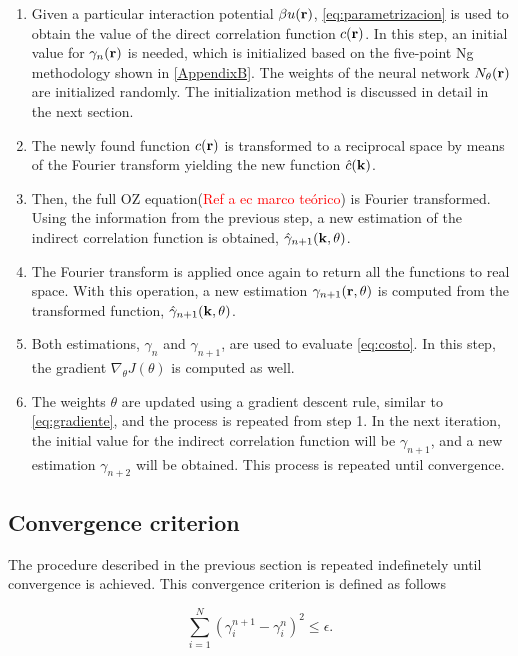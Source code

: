 \begin{enumerate}
    \item Given a particular interaction potential $\beta u(\mathbf{r})$, \autoref{eq:parametrizacion} is used to obtain the value of the direct correlation function $c(\mathbf{r})$. In this step, an initial value for $\gamma_{n}(\mathbf{r})$ is needed, which is initialized based on the five-point Ng methodology shown in \autoref{AppendixB}. The weights of the neural network $N_{\theta}(\mathbf{r})$ are initialized randomly. The initialization method is discussed in detail in the next section.
    \item The newly found function $c(\mathbf{r})$ is transformed to a reciprocal space by means of the Fourier transform yielding the new function $\hat{c}(\mathbf{k})$.
    \item Then, the full OZ equation(\textcolor{red}{Ref a ec marco teórico}) is Fourier transformed. Using the information from the previous step, a new estimation of the indirect correlation function is obtained, $\hat{\gamma}_{n+1}(\mathbf{k}, \theta)$.
    \item The Fourier transform is applied once again to return all the functions to real space. With this operation, a new estimation $\gamma_{n+1}(\mathbf{r}, \theta)$ is computed from the transformed function, $\hat{\gamma}_{n+1}(\mathbf{k}, \theta)$.
    \item Both estimations, $\gamma_{n}$ and $\gamma_{n+1}$, are used to evaluate \autoref{eq:costo}. In this step, the gradient $\nabla_{\theta} J(\theta)$ is computed as well.
    \item The weights $\theta$ are updated using a gradient descent rule, similar to \autoref{eq:gradiente}, and the process is repeated from step 1. In the next iteration, the initial value for the indirect correlation function will be $\gamma_{n+1}$, and a new estimation $\gamma_{n+2}$ will be obtained. This process is repeated until convergence.
\end{enumerate}

\subsection{Convergence criterion}
The procedure described in the previous section is repeated indefinetely until convergence
is achieved. This convergence criterion is defined as follows

\begin{equation}
    \sum_{i=1}^{N} {\left( \gamma^{n+1}_{i} - \gamma^{n}_{i} \right)}^2 \leq \epsilon .
    \label{eq:tolerancia}
\end{equation}

